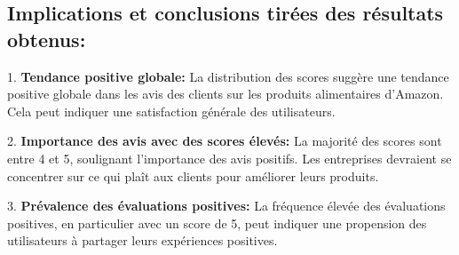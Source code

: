 \subsection{Implications et conclusions tirées des résultats obtenus:}

1. \textbf{Tendance positive globale:} La distribution des scores suggère une tendance positive globale dans les avis des clients sur les produits alimentaires d'Amazon. Cela peut indiquer une satisfaction générale des utilisateurs.

2. \textbf{Importance des avis avec des scores élevés:} La majorité des scores sont entre 4 et 5, soulignant l'importance des avis positifs. Les entreprises devraient se concentrer sur ce qui plaît aux clients pour améliorer leurs produits.

3. \textbf{Prévalence des évaluations positives:} La fréquence élevée des évaluations positives, en particulier avec un score de 5, peut indiquer une propension des utilisateurs à partager leurs expériences positives.
